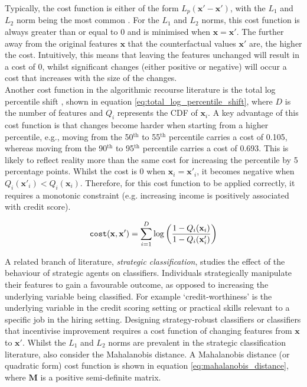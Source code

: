 Typically, the cost function is either of the form $L_p(\mathbf{x}'-\mathbf{x}')$, with the $L_1$ and $L_2$ norm being the most common \citep{ramakrishnanSynthesizingActionSequences2020, karimiSurveyAlgorithmicRecourse2022}. For the $L_1$ and $L_2$ norms, this cost function is always greater than or equal to 0 and is minimised when $\mathbf{x} =\mathbf{x}'$. The further away from the original features $\mathbf{x}$ that the counterfactual values $\mathbf{x}'$ are, the higher the cost. Intuitively, this means that leaving the features unchanged will result in a cost of 0, whilst significant changes (either positive or negative) will occur a cost that increases with the size of the changes.\\

Another cost function in the algorithmic recourse literature is the total log percentile shift \citep{ustunActionableRecourseLinear2019}, shown in equation \ref{eq:total_log_percentile_shift}, where $D$ is the number of features and $Q_i$ represents the CDF of $\mathbf{x}_i$. A key advantage of this cost function is that changes become harder when starting from a higher percentile, e.g., moving from the 50$^{\text{th}}$ to 55$^{\text{th}}$ percentile carries a cost of 0.105, whereas moving from the 90$^{\text{th}}$ to 95$^{\text{th}}$ percentile carries a cost of 0.693. This is likely to reflect reality more than the same cost for increasing the percentile by 5 percentage points. Whilst the cost is 0 when $\mathbf{x}_i = \mathbf{x}'_i$, it becomes negative when $Q_i(\mathbf{x}'_i) < Q_i(\mathbf{x}_i)$. Therefore, for this cost function to be applied correctly, it requires a monotonic constraint (e.g. increasing income is positively associated with credit score).

\begin{equation} \label{eq:total_log_percentile_shift}
	\operatorname*{\texttt{cost}}(\mathbf{x}, \mathbf{x}') = \sum_{i=1}^D \log \bigg( \frac{1 - Q_i(\mathbf{x}_i)}{1 - Q_i(\mathbf{x}_i')} \bigg)
\end{equation}

A related branch of literature, \textit{strategic classification}, studies the effect of the behaviour of strategic agents on classifiers. Individuals strategically manipulate their features to gain a favourable outcome, as opposed to increasing the underlying variable being classified. For example `credit-worthiness' is the underlying variable in the credit scoring setting or practical skills relevant to a specific job in the hiring setting. Designing strategy-robust classifiers or classifiers that incentivise improvement requires a cost function of changing features from $\mathbf{x}$ to $\mathbf{x}'$. Whilst the  $L_1$ and $L_2$ norms are prevalent in the strategic classification literature, \textcite{bechavodInformationDiscrepancyStrategic2022} also consider the Mahalanobis distance. A Mahalanobis distance (or quadratic form) cost function is shown in equation \ref{eq:mahalanobis_distance}, where $\mathbf{M}$ is a positive semi-definite matrix. 

